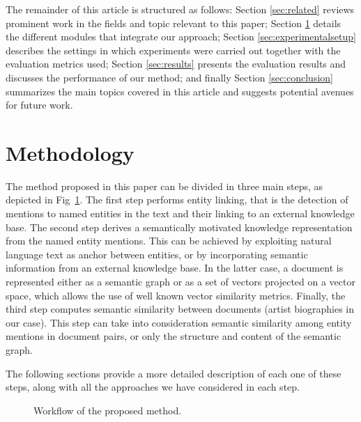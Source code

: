 The remainder of this article is structured as follows: Section \ref{sec:related} reviews prominent work in the fields and topic relevant to this paper; Section \ref{sec:methodology} details the different modules that integrate our approach; Section \ref{sec:experimentalsetup} describes the settings in which experiments were carried out together with the evaluation metrics used; Section \ref{sec:results} presents the evaluation results and discusses the performance of our method; and finally Section \ref{sec:conclusion} summarizes the main topics covered in this article and suggests potential avenues for future work.


\section{Methodology} %
\label{sec:methodology}

The method proposed in this paper %
can be divided in three main steps, as depicted in Fig~\ref{fig:methodology}.
The first step performs entity linking, that is the detection of mentions to named entities in the text and their linking to an external knowledge base.
The second step derives a semantically motivated knowledge representation from the named entity mentions. This can be achieved by exploiting natural language text as anchor between entities, or by incorporating semantic information from an external knowledge base. In the latter case, a document is represented either as a semantic graph or as a set of vectors projected on a vector space, which allows the use of well known vector similarity metrics.
Finally, the third step computes semantic similarity between documents (artist biographies in our case). This step can take into consideration semantic similarity among entity mentions in document pairs, or only the structure and content of the semantic graph.

The following sections provide a more detailed description of each one of these steps, along with all the approaches we have considered in each step.

\begin{figure}[!htp]
\centerline{}
\caption{Workflow of the proposed method.}
\label{fig:methodology}
\end{figure}

